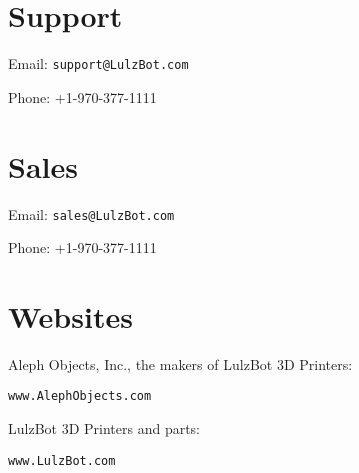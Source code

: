 \section{Support}
\setlength{\parindent}{0pt}
Email: \texttt{support@LulzBot.com}

Phone: +1-970-377-1111

\section{Sales}

Email: \texttt{sales@LulzBot.com}

Phone: +1-970-377-1111

\section{Websites}

Aleph Objects, Inc., the makers of LulzBot 3D Printers:

\texttt{www.AlephObjects.com}

LulzBot 3D Printers and parts:

\texttt{www.LulzBot.com}
